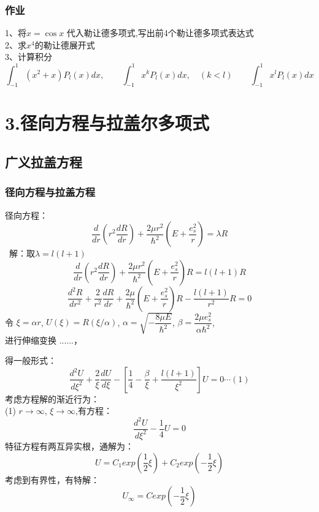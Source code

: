 \begin{frame}
	\frametitle{作业}
	1、将$x=\cos x$ 代入勒让德多项式,写出前4个勒让德多项式表达式 \\
	2、求$x^4$的勒让德展开式\\
	3、计算积分
	\begin{equation*}
		\int_{-1}^{1} (x^2+x) P_l(x) dx, \qquad \int_{-1}^{1} x^k P_l(x) dx, \quad(k<l) \qquad  	\int_{-1}^{1} x^l P_l(x) dx   
	\end{equation*}
\end{frame}	



\section{3.径向方程与拉盖尔多项式}

\subsection{广义拉盖方程}

\begin{frame}
	\frametitle{径向方程与拉盖方程}
	径向方程：
	\begin{equation*}
		\boxed{\frac{d}{d r} (r^2\frac{d R }{d r} ) + \frac{2 \mu r^2} {\hbar^2}(E+ \frac{e_s ^2}{r} ) =\lambda R}
	\end{equation*}	
	\alert{ 解：}取$ \lambda =l(l+1)  $
	\begin{equation*}
		\frac{d}{d r} (r^2\frac{d R }{d r} ) + \frac{2 \mu r^2} {\hbar^2}(E+ \frac{e_s ^2}{r} ) R=l(l+1) R
	\end{equation*}	
	\begin{equation*}
		\frac{d^2 R}{d r^2} + \frac{2}{r^2}\frac{d R }{d r}  + \frac{2 \mu} {\hbar^2}(E+ \frac{e_s ^2}{r} ) R- \frac{l(l+1)}{r^2} R=0
	\end{equation*}	
	令 $\xi=\alpha r$, $U(\xi)=R(\xi /\alpha) $, $\alpha =\sqrt{-\dfrac{8\mu E}{\hbar^2}}$, $\beta=\dfrac{2\mu e^2 _s}{\alpha \hbar^2}$,\\
	进行伸缩变换 ......，
\end{frame}	

\begin{frame}
	得一般形式：
	\begin{equation*}
		\frac{d^2 U}{d \xi ^2} + \frac{2}{\xi }\frac{d U }{d \xi}  -[ \frac{1} {4}  -\frac{\beta}{\xi} + \frac{l(l+1)}{\xi ^2}] U=0  \cdots (1)
	\end{equation*}	 
	考虑方程解的渐近行为： \\
	(1) $r\to \infty$, $\xi \to \infty$,有方程：
	\begin{equation*}
		\frac{d^2 U}{d \xi ^2}   - \frac{1} {4}  U=0
	\end{equation*}	
	特征方程有两互异实根，通解为：
	\begin{equation*}
		U=C_1 exp(\frac{1}{2}\xi ) +C_2 exp(-\frac{1}{2}\xi ) 
	\end{equation*}	
	考虑到有界性，有特解：
	\begin{equation*}
		U_\infty  =  C  exp(-\frac{1}{2}\xi ) 
	\end{equation*}	
\end{frame}	

